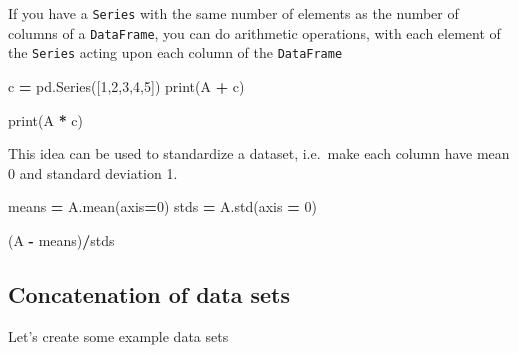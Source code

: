 \documentclass[
  letterpaper,
]{scrbook}
\newenvironment{Shaded}{\begin{snugshade}}{\end{snugshade}}
\newcommand{\BuiltInTok}[1]{#1}
\newcommand{\DecValTok}[1]{\textcolor[rgb]{0.00,0.00,0.81}{#1}}
\newcommand{\NormalTok}[1]{#1}
\newcommand{\OperatorTok}[1]{\textcolor[rgb]{0.81,0.36,0.00}{\textbf{#1}}}
\begin{document}
If you have a \texttt{Series} with the same number of elements as the number of columns of a \texttt{DataFrame}, you can do arithmetic operations, with each element of the \texttt{Series} acting upon each column of the \texttt{DataFrame}

\begin{Shaded}
\begin{Highlighting}[]
\NormalTok{c }\OperatorTok{=}\NormalTok{ pd.Series([}\DecValTok{1}\NormalTok{,}\DecValTok{2}\NormalTok{,}\DecValTok{3}\NormalTok{,}\DecValTok{4}\NormalTok{,}\DecValTok{5}\NormalTok{])}
\BuiltInTok{print}\NormalTok{(A }\OperatorTok{+}\NormalTok{ c)}
\end{Highlighting}
\end{Shaded}

\begin{Shaded}
\begin{Highlighting}[]
\BuiltInTok{print}\NormalTok{(A }\OperatorTok{*}\NormalTok{ c)}
\end{Highlighting}
\end{Shaded}

This idea can be used to standardize a dataset, i.e.~make each column have mean 0 and standard deviation 1.

\begin{Shaded}
\begin{Highlighting}[]
\NormalTok{means }\OperatorTok{=}\NormalTok{ A.mean(axis}\OperatorTok{=}\DecValTok{0}\NormalTok{)}
\NormalTok{stds }\OperatorTok{=}\NormalTok{ A.std(axis }\OperatorTok{=} \DecValTok{0}\NormalTok{)}

\NormalTok{(A }\OperatorTok{{-}}\NormalTok{ means)}\OperatorTok{/}\NormalTok{stds}
\end{Highlighting}
\end{Shaded}

\hypertarget{concatenation-of-data-sets}{%
\subsection{Concatenation of data sets}\label{concatenation-of-data-sets}}

Let's create some example data sets
\end{document}
